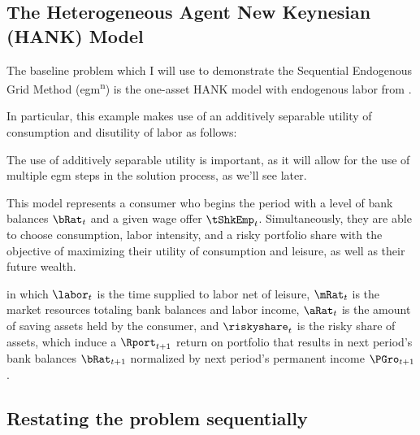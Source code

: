 \documentclass{article}
\begin{document}

\subsection{The Heterogeneous Agent New Keynesian (HANK) Model}

The baseline problem which I will use to demonstrate the Sequential Endogenous Grid Method (\acrshort{egm}\textsuperscript{n}) is the one-asset HANK model with endogenous labor from \cite{Auclert_2021}.

In particular, this example makes use of an additively separable utility of consumption and disutility of labor as follows:

The use of additively separable utility is important, as it will allow for the use of multiple \acrshort{egm} steps in the solution process, as we'll see later.

This model represents a consumer who begins the period with a level of bank balances $\bRat_{t}$ and a given wage offer $\tShkEmp_{t}$. Simultaneously, they are able to choose consumption, labor intensity, and a risky portfolio share with the objective of maximizing their utility of consumption and leisure, as well as their future wealth.

in which $\labor_{t}$ is the time supplied to labor net of leisure, $\mRat_{t}$ is the market resources totaling bank balances and labor income, $\aRat_{t}$ is the amount of saving assets held by the consumer, and $\riskyshare_{t}$ is the risky share of assets, which induce a $\Rport_{t+1}$ return on portfolio that results in next period's bank balances $\bRat_{t+1}$ normalized by next period's permanent income $\PGro_{t+1}$.

\subsection{Restating the problem sequentially}
\end{document}
